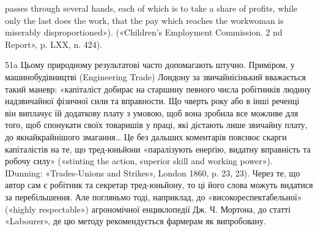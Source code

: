 passes through several hands, each of which is to take a share of profits,
while only the last does the work, that the pay which reaches the workwoman
is miserably disproportioned»). («Children’s Employment Commission.
2 nd Report», p. LXX, n. 424).

51a Цьому природному результатові часто допомагають штучно.
Приміром, у машинобудівництві (Engineering Trade) Лондону за звичайнісінький
вважається такий маневр: «капіталіст добирає на старшину
певного числа робітників людину надзвичайної фізичної сили та вправности.
Що чверть року або в інші реченці він виплачує їй додаткову плату
з умовою, щоб вона зробила все можливе для того, щоб спонукати своїх
товаришів у праці, які дістають лише звичайну плату, до якнайкрайнішого
змагання\dots{} Це без дальших коментарів пояснює скарги капіталістів на
те, що тред-юньйони «паралізують енерґію, видатну вправність та
робочу силу» («stinting the action, superior skill and working power»).
IDunning: «Trades-Unions and Strikes», London 1860, p. 23, 23). Через
те, що автор сам є робітник та секретар тред-юньйону, то ці його слова
можуть видатися за перебільшення. Але погляньмо тоді, наприклад,
до «високореспектабельної» («highly respectable») агрономічної енциклопедії
Дж. Ч. Мортона, до статті «Labourer», де цю методу рекомендується
фармерам як випробовану.
\parbreak{}  %
